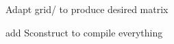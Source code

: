 
\begin{DoxyRefList}
\item[\label{todo__todo000001}%
\hypertarget{todo__todo000001}{}%
Module \hyperlink{namespacemirana}{mirana} ]Adapt grid/ to produce desired matrix 

add Sconstruct to compile everything 
\end{DoxyRefList}